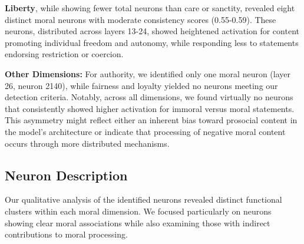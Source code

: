 \documentclass[runninghheads]{llncs}
\begin{document}
\textbf{Liberty}, while showing fewer total neurons than care or sanctity, revealed eight distinct moral neurons with moderate consistency scores (0.55-0.59). These neurons, distributed across layers 13-24, showed heightened activation for content promoting individual freedom and autonomy, while responding less to statements endorsing restriction or coercion.

\textbf{Other Dimensions:} For authority, we identified only one moral neuron (layer 26, neuron 2140), while fairness and loyalty yielded no neurons meeting our detection criteria. Notably, across all dimensions, we found virtually no neurons that consistently showed higher activation for immoral versus moral statements. This asymmetry might reflect either an inherent bias toward prosocial content in the model's architecture or indicate that processing of negative moral content occurs through more distributed mechanisms.



\subsection{Neuron Description}

Our qualitative analysis of the identified neurons revealed distinct functional clusters within each moral dimension. We focused particularly on neurons showing clear moral associations while also examining those with indirect contributions to moral processing.
\end{document}
